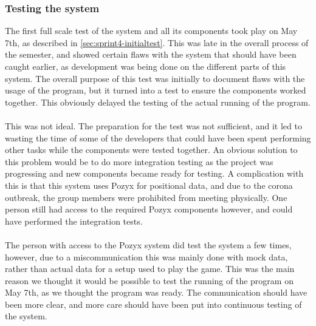 \subsubsection{Testing the system}
The first full scale test of the system and all its components took play on May 7th, as described in \autoref{sec:sprint4-initialtest}.
This was late in the overall process of the semester, and showed certain flaws with the system that should have been caught earlier, as development was being done on the different parts of this system.
The overall purpose of this test was initially to document flaws with the usage of the program, but it turned into a test to ensure the components worked together.
This obviously delayed the testing of the actual running of the program.
\\\\
This was not ideal.
The preparation for the test was not sufficient, and it led to wasting the time of some of the developers that could have been spent performing other tasks while the components were tested together.
An obvious solution to this problem would be to do more integration testing as the project was progressing and new components became ready for testing.
A complication with this is that this system uses Pozyx for positional data, and due to the corona outbreak, the group members were prohibited from meeting physically.
One person still had access to the required Pozyx components however, and could have performed the integration tests.
\\\\
The person with access to the Pozyx system did test the system a few times, however, due to a miscommunication this was mainly done with mock data, rather than actual data for a setup used to play the game.
This was the main reason we thought it would be possible to test the running of the program on May 7th, as we thought the program was ready.
The communication should have been more clear, and more care should have been put into continuous testing of the system.

